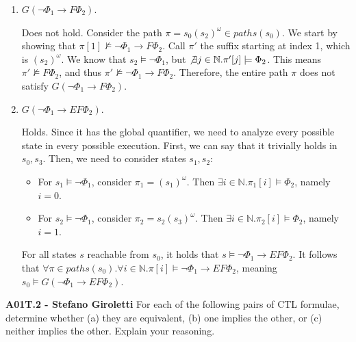 \documentclass[12pt,a4paper]{article}
\begin{document}
\begin{description}
\begin{enumerate}[label=\alph*)]
%
\ifwithanswers
\color{blue}
\par
Does not hold. Consider the path $\pi = s_0 s_2 (s_2)^{\omega} \in paths(s_0)$. Since $s_0, s_2 \not\models \Phi_2$, then $\not\exists i \in \mathbb{N}$ such that $\pi[i] \models \Phi_2$. By semantics, it follows that $\pi \not\models \Phi_1 \ U \ \Phi_2$, making it a counterexample.
\color{black}
\fi
%
\item $G ( \neg \Phi_1 \rightarrow F \Phi_2)$.
%
\ifwithanswers
\color{blue}
\par
Does not hold. Consider the path $\pi = s_0(s_2)^{\omega} \in paths(s_0)$. We start by showing that $\pi[1] \not\models \neg \Phi_1 \rightarrow F \Phi_2$. Call $\pi'$ the suffix starting at index 1, which is $(s_2)^{\omega}$. We know that $s_2 \models \neg \Phi_1$, but $\not\exists j \in \mathbb{N} . \pi'[j] \models \Phi_2$. This means $\pi' \not\models F \Phi_2$, and thus $\pi' \not\models \neg \Phi_1 \rightarrow F \Phi_2$. Therefore, the entire path $\pi$ does not satisfy $G(\neg \Phi_1 \rightarrow F \Phi_2)$.
\color{black}
\fi
%
\item $G ( \neg \Phi_1 \rightarrow EF \Phi_2)$.
%
\ifwithanswers
\color{blue}
\par
Holds. Since it has the global quantifier, we need to analyze every possible state in every possible execution. First, we can say that it trivially holds in $s_0, s_3$. Then, we need to consider states $s_1, s_2$:
\begin{itemize}
    \item For $s_1 \models \neg \Phi_1$, consider $\pi_1 = (s_1)^{\omega}$. Then $\exists i \in \mathbb{N} . \pi_1[i] \models \Phi_2$, namely $i=0$.
    \item For $s_2 \models \neg \Phi_1$, consider $\pi_2 = s_2(s_3)^{\omega}$. Then $\exists i \in \mathbb{N} . \pi_2[i] \models \Phi_2$, namely $i=1$.
\end{itemize}
For all states $s$ reachable from $s_0$, it holds that $s \models \neg \Phi_1 \rightarrow EF \Phi_2$. It follows that $\forall \pi \in paths(s_0) . \forall i \in \mathbb{N} . \pi[i] \models \neg \Phi_1 \rightarrow EF \Phi_2$, meaning $s_0 \models G(\neg \Phi_1 \rightarrow EF \Phi_2)$.
\color{black}
\fi
%
\end{enumerate}

\clearpage
\item{\bf A01T.2 - Stefano Giroletti} For each of the following pairs of CTL formulae, determine whether (a) they are equivalent, (b) one implies the other,
or (c) neither implies the other. Explain your reasoning. 


\end{description}
\end{document}
